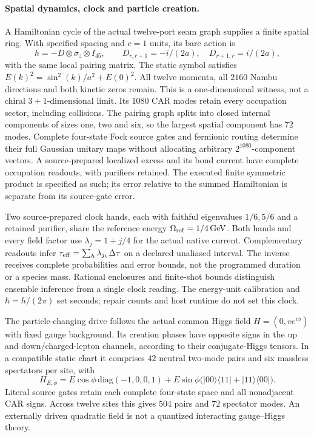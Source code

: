 \paragraph{Spatial dynamics, clock and particle creation.}
A Hamiltonian cycle of the actual twelve-port seam graph supplies a finite
spatial ring. With specified spacing and $c=1$ units, its bare action is
\[
 h=-D\otimes\sigma_z\otimes I_{45},\qquad
 D_{r,r+1}=-i/(2a),\quad D_{r+1,r}=i/(2a),
\]
with the same local pairing matrix. The static symbol satisfies
$E(k)^2=\sin^2(k)/a^2+E(0)^2$. All twelve momenta, all $2160$ Nambu
directions and both kinetic zeros remain. This is a one-dimensional
witness, not a chiral $3+1$-dimensional limit. Its $1080$ CAR modes retain
every occupation sector, including collisions. The pairing graph splits
into closed internal components of sizes one, two and six, so the largest
spatial component has $72$ modes. Complete four-state Fock source gates
and fermionic routing determine their full Gaussian unitary maps without
allocating arbitrary $2^{1080}$-component vectors. A source-prepared
localized excess and its bond current have complete occupation readouts,
with purifiers retained. The executed finite symmetric product is
specified as such; its error relative to the summed Hamiltonian is
separate from its source-gate error.

Two source-prepared clock hands, each with faithful eigenvalues $1/6,5/6$
and a retained purifier, share the reference energy
$\Omega_{\rm ref}=1/4\,\mathrm{GeV}$. Both hands and every field factor use
$\lambda_j=1+j/4$ for the actual native current. Complementary readouts
infer $\tau_{\rm eff}=\sum_h\lambda_{j_h}\Delta\tau$ on a declared
unaliased interval. The inverse receives complete probabilities and error
bounds, not the programmed duration or a species mass. Rational enclosures
and finite-shot bounds distinguish ensemble inference from a single
clock reading. The energy-unit calibration and $\hbar=h/(2\pi)$ set
seconds; repair counts and host runtime do not set this clock.

The particle-changing drive follows the actual common Higgs field
$H=(0,v e^{i\phi})$ with fixed gauge background. Its creation phases have
opposite signs in the up and down/charged-lepton channels, according to
their conjugate-Higgs tensors. In a compatible static chart it comprises
$42$ neutral two-mode pairs and six massless spectators per site, with
\[
 H_{E,\phi}=E\cos\phi\,\mathrm{diag}(-1,0,0,1)
 +E\sin\phi\bigl(|00\rangle\langle11|+|11\rangle\langle00|\bigr).
\]
Literal source gates retain each complete four-state space and all
nonadjacent CAR signs. Across twelve sites this gives $504$ pairs and
$72$ spectator modes. An externally driven quadratic field is not
a quantized interacting gauge--Higgs theory.

